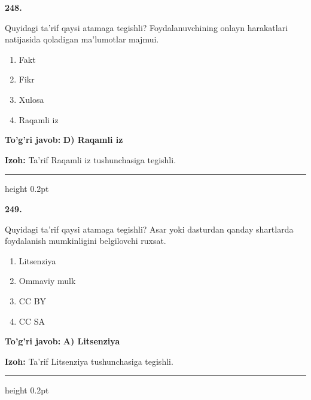 \documentclass[10pt,a4paper,oneside]{article}
\begin{document}
\noindent\textbf{\color{ink}248.}
\par
Quyidagi ta'rif qaysi atamaga tegishli? Foydalanuvchining onlayn harakatlari natijasida qoladigan ma'lumotlar majmui.
\begin{enumerate}[label=\Alph*),leftmargin=9mm]
\item Fakt
\item Fikr
\item Xulosa
\item Raqamli iz
\end{enumerate}
\begin{tcolorbox}[enhanced,breakable,colback=teal!4,colframe=teal!50!black,boxrule=0.5pt,arc=1.1mm,left=3mm,right=3mm,top=1.7mm,bottom=1.7mm,before skip=2mm,after skip=2mm]
\textbf{\color{teal}To'g'ri javob:} \textbf{D) Raqamli iz}
\par\smallskip
\textbf{Izoh:} Ta'rif Raqamli iz tushunchasiga tegishli.
\end{tcolorbox}
\vspace{2mm}\hrule height 0.2pt \vspace{3mm}

\noindent\textbf{\color{ink}249.}
\par
Quyidagi ta'rif qaysi atamaga tegishli? Asar yoki dasturdan qanday shartlarda foydalanish mumkinligini belgilovchi ruxsat.
\begin{enumerate}[label=\Alph*),leftmargin=9mm]
\item Litsenziya
\item Ommaviy mulk
\item CC BY
\item CC SA
\end{enumerate}
\begin{tcolorbox}[enhanced,breakable,colback=teal!4,colframe=teal!50!black,boxrule=0.5pt,arc=1.1mm,left=3mm,right=3mm,top=1.7mm,bottom=1.7mm,before skip=2mm,after skip=2mm]
\textbf{\color{teal}To'g'ri javob:} \textbf{A) Litsenziya}
\par\smallskip
\textbf{Izoh:} Ta'rif Litsenziya tushunchasiga tegishli.
\end{tcolorbox}
\vspace{2mm}\hrule height 0.2pt \vspace{3mm}
\end{document}
